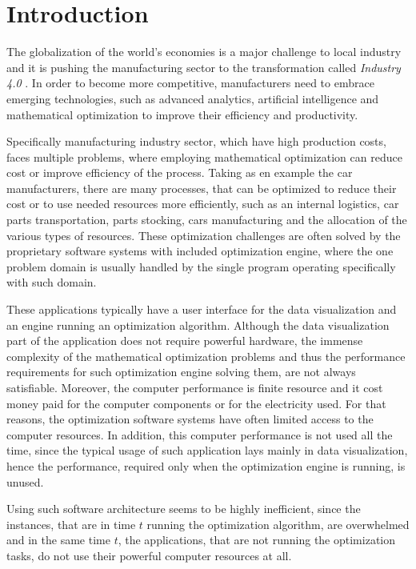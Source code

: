 \chapter{Introduction}\label{ch:introduction}
The globalization of the world’s economies is a major challenge to local industry 
and it is pushing the manufacturing sector to the transformation called \textit{Industry 4.0} \cite{industry40}.
In order to become more competitive, 
manufacturers need to embrace emerging technologies, 
such as advanced analytics, artificial intelligence 
and mathematical optimization to improve their efficiency and productivity.

Specifically manufacturing industry sector,
which have high production costs,
faces multiple problems,
where employing mathematical optimization can reduce cost or improve efficiency of the process.
Taking as en example the car manufacturers,
there are many processes,
that can be optimized to reduce their cost or to use needed resources more efficiently,
such as an internal logistics, car parts transportation, parts stocking, cars manufacturing 
and the allocation of the various types of resources.
These optimization challenges are often solved by the proprietary software systems with included optimization engine,
where the one problem domain is usually handled by the single program operating specifically with such domain.

These applications typically have a user interface for the data visualization
and an engine running an optimization algorithm.
Although the data visualization part of the application does not require powerful hardware,
the immense complexity of the mathematical optimization problems 
and thus the performance requirements for such optimization engine solving them, are not always satisfiable.
Moreover,
the computer performance is finite resource
and it cost money paid for the computer components or for the electricity used.
For that reasons,
the optimization software systems have often limited access to the computer resources.
In addition,
this computer performance is not used all the time,
since the typical usage of such application lays mainly in data visualization,
hence the performance, required only when the optimization engine is running, is unused.

Using such software architecture seems to be highly inefficient,
since the instances, that are in time $t$ running the optimization algorithm, are overwhelmed 
and in the same time $t$,
the applications, that are not running the optimization tasks,
do not use their powerful computer resources at all.

